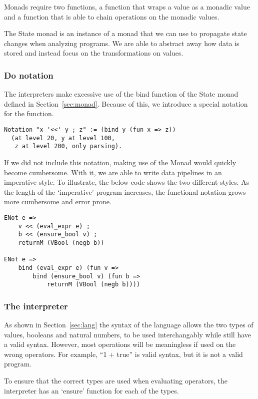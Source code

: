 Monads require two functions, a  function that wraps a value as a
monadic value and a  function that is able to chain operations on the
monadic values. 

The State monad is an instance of a monad that we can use to propagate state
changes when analyzing programs. We are able to abstract away how data is
stored and instead focus on the transformations on values.

\subsubsection{Do notation}
The interpreters make excessive use of the bind function of the State monad
defined in Section~\ref{sec:monad}. Because of this, we introduce a special
notation for the function.

\begin{verbatim}
Notation "x '<<' y ; z" := (bind y (fun x => z))
  (at level 20, y at level 100, 
   z at level 200, only parsing).
\end{verbatim}

If we did not include this notation, making use of the Monad would quickly
become cumbersome. With it, we are able to write data pipelines in an
imperative style. To illustrate, the below code shows the two
different styles. As the length of the `imperative' program increases, the
functional notation grows more cumbersome and error prone.

\begin{verbatim}
ENot e =>
	v << (eval_expr e) ;
	b << (ensure_bool v) ;
	returnM (VBool (negb b))

ENot e =>
	bind (eval_expr e) (fun v =>
		bind (ensure_bool v) (fun b =>
			returnM (VBool (negb b))))
\end{verbatim}


\subsubsection{The interpreter}
As shown in Section~\ref{sec:lang} the syntax of the language allows the two
types of values, booleans and natural numbers, to be used interchangably while
still have a valid syntax. However, most operations will be meaningless if used
on the wrong operators. For example, ``1 + true'' is valid syntax, but it is 
not a valid program.

To ensure that the correct types are used when evaluating operators,
the interpreter has an `ensure' function for each of the types. 

